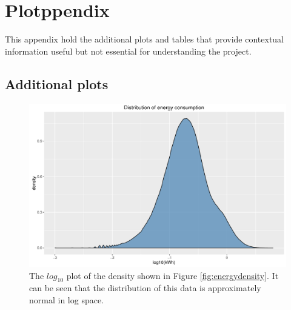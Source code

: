 
\appendix
\chapter{Plotppendix}
\label{Plotpend}
This appendix hold the additional plots and tables that provide contextual information useful but not essential for understanding the project.  


\section{Additional plots}

\begin{figure}
    \centering
    \includegraphics[width = \textwidth]{Figures/Appendix/logenergydensity}
    \caption[Log energy density]{The $log_{10}$ plot of the density shown in Figure \ref{fig:energydensity}. It can be seen that the distribution of this data is approximately normal in log space.}
    \label{fig:logenergydensity}
\end{figure}



